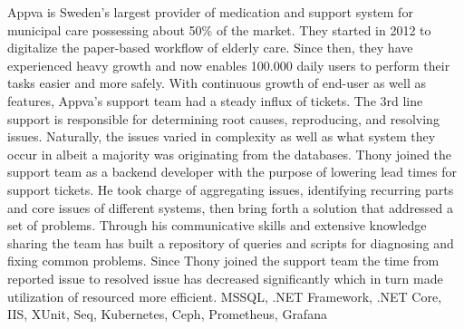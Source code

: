 \begin{experiences}
{        Appva is Sweden’s largest provider of medication and support system for municipal care possessing about 50\% of the market.
        They started in 2012 to digitalize the paper-based workflow of elderly care. Since then, they have experienced heavy growth and now enables 100.000 daily users to perform their tasks easier and more safely.
        \newline \newline
        With continuous growth of end-user as well as features, Appva's support team had a steady influx of tickets.
        The 3rd line support is responsible for determining root causes, reproducing, and resolving issues.
        Naturally, the issues varied in complexity as well as what system they occur in albeit a majority was originating from the databases.
        \newline \newline
        Thony joined the support team as a backend developer with the purpose of lowering lead times for support tickets.
        He took charge of aggregating issues, identifying recurring parts and core issues of different systems, then bring forth a solution that addressed a set of problems.
        Through his communicative skills and extensive knowledge sharing the team has built a repository of queries and scripts for diagnosing and fixing common problems.
        Since Thony joined the support team the time from reported issue to resolved issue has decreased significantly which in turn made utilization of resourced more efficient.    
        \newline
    }
    {MSSQL, .NET Framework, .NET Core, IIS, XUnit, Seq, Kubernetes, Ceph,
Prometheus, Grafana}   
    \emptySeparator            
    

\end{experiences}
